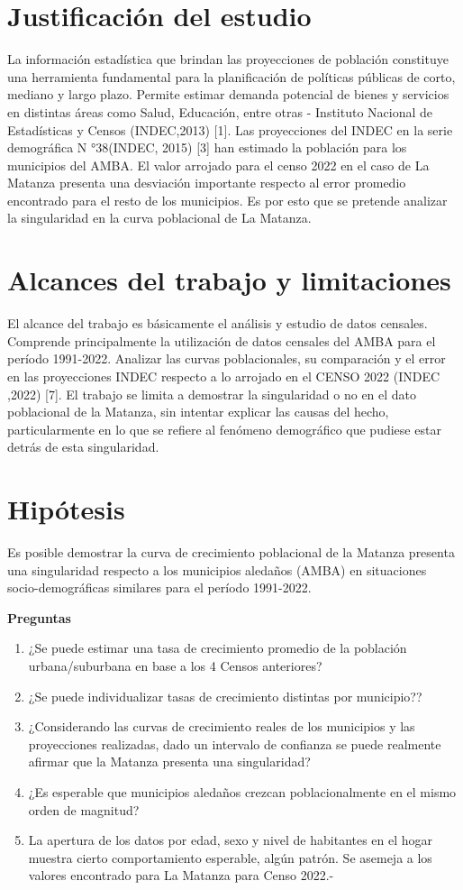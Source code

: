 \documentclass{article}
\theoremstyle{mytheoremstyle}
\theoremstyle{mytheoremstyle}
\theoremstyle{myproblemstyle}
\begin{document}
\section{Justificación del estudio}
La información estadística que brindan las proyecciones de población constituye una herramienta fundamental para la planificación de políticas públicas de corto, mediano y largo plazo. Permite estimar demanda potencial de bienes y servicios en distintas áreas como Salud, Educación, entre otras - Instituto Nacional de Estadísticas y Censos (INDEC,2013) [1].
Las proyecciones del INDEC en la serie demográfica N °38(INDEC, 2015) [3] han estimado la población para los municipios del AMBA. El valor arrojado para el censo 2022 en el caso de La Matanza presenta una desviación importante respecto al error promedio encontrado para el resto de los municipios. Es por esto que se pretende analizar la singularidad en la curva poblacional de La Matanza.

\section{ Alcances del trabajo y limitaciones}
El alcance del trabajo es básicamente el análisis y estudio de datos censales. Comprende principalmente la utilización de datos censales del AMBA para el período 1991-2022. Analizar las curvas poblacionales, su comparación y el error en las proyecciones INDEC respecto a lo arrojado en el CENSO 2022 (INDEC ,2022) [7].  El trabajo se limita a demostrar la singularidad o no en el dato poblacional de la Matanza, sin intentar explicar las causas del hecho, particularmente en lo que se refiere al fenómeno 
demográfico que pudiese estar detrás de esta singularidad.
\section{Hipótesis}
Es posible demostrar la curva de crecimiento poblacional de la Matanza presenta una singularidad respecto a los municipios aledaños (AMBA) en situaciones socio-demográficas 
similares para el período 1991-2022. 

\textbf{Preguntas}
\begin{enumerate}
  \item ¿Se puede estimar una tasa de crecimiento promedio de la población urbana/suburbana en base a los 4 Censos anteriores?
  \item ¿Se puede individualizar tasas de crecimiento distintas por municipio??
  \item ¿Considerando las curvas de crecimiento reales de los municipios y las proyecciones realizadas, dado un intervalo de confianza se puede realmente afirmar que la Matanza presenta una singularidad?
  \item ¿Es esperable que municipios aledaños crezcan poblacionalmente en el mismo orden de magnitud?
  \item La apertura de los datos por edad, sexo y nivel de habitantes en el hogar muestra cierto comportamiento esperable, algún patrón. Se asemeja a los valores encontrado para La Matanza para Censo 2022.-
\end{enumerate}
\end{document}

